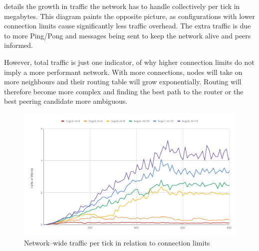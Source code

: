  details the growth in traffic the network has to handle collectively per tick in megabytes. This diagram paints the opposite picture, as configurations with lower connection limits cause significantly less traffic overhead. The extra traffic is due to more Ping/Pong and \peerUpdate messages being sent to keep the network alive and peers informed.

However, total traffic is just one indicator, of why higher connection limits do not imply a more performant network. With more connections, nodes will take on more neighbours and their routing table will grow exponentially. Routing will therefore become more complex and finding the best path to the router or the best peering candidate more ambiguous.

\begin{figure}[htb!]
\centering
\includegraphics[width=1.0\textwidth]{graphics/analysis/connection-limit-total-io.pdf}
\caption{Network–wide traffic per tick in relation to connection limits}
\label{fig:connection-limits-total-io}
\end{figure}
